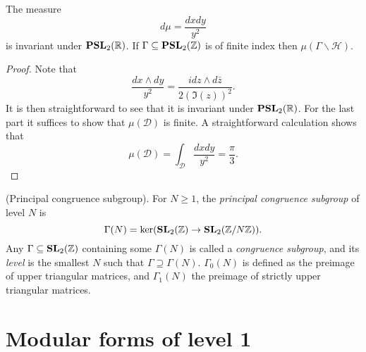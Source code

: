 \documentclass{memoir}
\begin{document}
\begin{proposition}
    The measure
    \begin{equation}
        d\mu = \frac{dx dy}{y^2}
    \end{equation}
    is invariant under $\mathbf{PSL}_2(\mathbb{R})$. 
    If $\Gamma\subseteq \mathbf{PSL}_2(\mathbb{Z})$ is of finite index then $\mu(\Gamma \backslash \mathcal H)$.
\end{proposition}
\begin{proof}
    Note that
    \begin{equation}
        \frac{dx\wedge dy}{y^2} = \frac{i dz\wedge d\bar z}{2(\Im(z))^2}.
    \end{equation}
    It is then straightforward to see that it is invariant under $\mathbf{PSL}_2(\mathbb{R})$.
    For the last part it suffices to show that $\mu(\mathcal D)$ is finite.
    A straightforward calculation shows that
    \begin{equation}
        \mu(\mathcal D) = \int_{\mathcal D} \frac{dxdy}{y^2} = \frac{\pi}3. 
    \end{equation}
\end{proof}
\begin{definition}
    (Principal congruence subgroup).
    For $N\ge 1$, the \textit{principal congruence subgroup} of level $N$ is
    \begin{equation}
        \Gamma(N) = \ker(\mathbf{SL}_2(\mathbb{Z})\to\mathbf{SL}_2(\mathbb{Z}/N\mathbb{Z})).
    \end{equation}
    Any $\Gamma\subseteq \mathbf{SL}_2(\mathbb{Z})$ containing some $\Gamma(N)$ is called a \textit{congruence subgroup}, and its \textit{level} is the smallest $N$ such that $\Gamma\supseteq \Gamma(N)$.
    $\Gamma_0(N)$ is defined as the preimage of upper triangular matrices, and $\Gamma_1(N)$ the preimage of strictly upper triangular matrices.
\end{definition}
\chapter{Modular forms of level 1}
\end{document}

